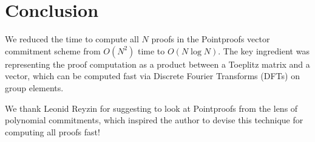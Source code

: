 \section{Conclusion}
We reduced the time to compute all $N$ proofs in the Pointproofs vector commitment scheme from $O(N^2)$ time to $O(N\log{N})$.
The key ingredient was representing the proof computation as a product between a Toeplitz matrix and a vector, which can be computed fast via Discrete Fourier Transforms (DFTs) on group elements.

We thank Leonid Reyzin for suggesting to look at Pointproofs from the lens of polynomial commitments, which inspired the author to devise this technique for computing all proofs fast!